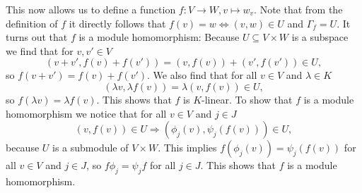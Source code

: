 \documentclass[a4paper,10pt]{article}
\begin{document}
This now allows us to define a function $f : V \rightarrow W, v \mapsto w_v$. Note that from the definition of $f$ it directly follows that $f(v)=w \Leftrightarrow (v,w) \in U$ and $\Gamma_f = U$. It turns out that $f$ is a module homomorphism: Because $U \subseteq V \times W$ is a subspace we find that for $v, v' \in V$
\[
 (v+v',f(v)+f(v')) = (v,f(v))+(v',f(v')) \in U,
\]
so $f(v+v') = f(v) + f(v')$. We also find that for all $v \in V$ and $\lambda \in K$
\[
 (\lambda v, \lambda f(v)) = \lambda (v,f(v)) \in U,
\]
so $f(\lambda v) = \lambda f(v)$. This shows that $f$ is $K$-linear. To show that $f$ is a module homomorphism we notice that for all $v \in V$ and $j \in J$
\[
 (v,f(v)) \in U \Rightarrow (\phi_j(v), \psi_j(f(v))) \in U,
\]
because $U$ is a submodule of $V \times W$. This implies $f(\phi_j(v)) = \psi_j(f(v))$ for all $v \in V$ and $j \in J$, so $f \phi_j = \psi_j f$ for all $j \in J$. This shows that $f$ is a module homomorphism.
\end{document}
